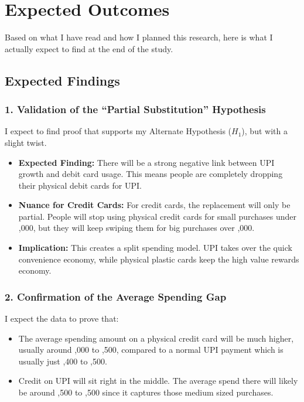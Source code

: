 \chapter{Expected Outcomes}

Based on what I have read and how I planned this research, here is what I actually expect to find at the end of the study.

\section{Expected Findings}

\subsection{1. Validation of the ``Partial Substitution'' Hypothesis}

I expect to find proof that supports my Alternate Hypothesis ($H_1$), but with a slight twist.

\begin{itemize}
    \item \textbf{Expected Finding:} There will be a strong negative link between UPI growth and debit card usage. This means people are completely dropping their physical debit cards for UPI.
    \item \textbf{Nuance for Credit Cards:} For credit cards, the replacement will only be partial. People will stop using physical credit cards for small purchases under ,000, but they will keep swiping them for big purchases over ,000.
    \item \textbf{Implication:} This creates a split spending model. UPI takes over the quick convenience economy, while physical plastic cards keep the high value rewards economy.
\end{itemize}

\subsection{2. Confirmation of the Average Spending Gap}

I expect the data to prove that:

\begin{itemize}
    \item The average spending amount on a physical credit card will be much higher, usually around ,000 to ,500, compared to a normal UPI payment which is usually just ,400 to ,500.
    \item Credit on UPI will sit right in the middle. The average spend there will likely be around ,500 to ,500 since it captures those medium sized purchases.
\end{itemize}

